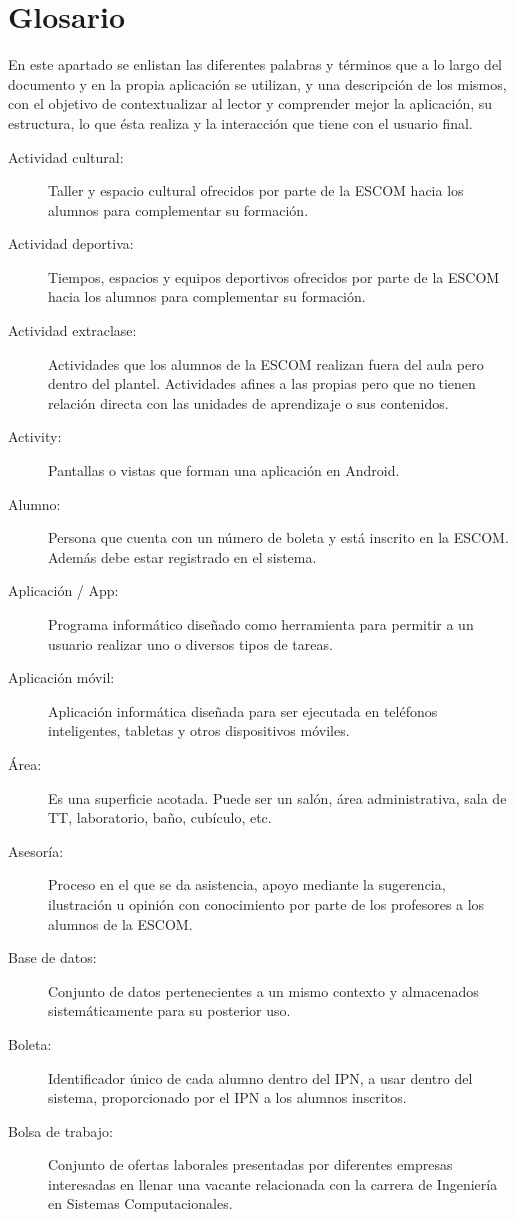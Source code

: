 \section{Glosario}

\noindent
En este apartado se enlistan las diferentes palabras y términos que a lo largo del documento y en la propia aplicación se utilizan, y una descripción de los mismos, con el objetivo de contextualizar al lector y comprender mejor la aplicación, su estructura, lo que ésta realiza y la interacción que tiene con el usuario final. \\

\begin{description}
	\item[Actividad cultural:] Taller y espacio cultural ofrecidos por parte de la ESCOM hacia los alumnos para complementar su formación. 
	\item[Actividad deportiva:] Tiempos, espacios y equipos deportivos ofrecidos por parte de la ESCOM hacia los alumnos para complementar su formación. 
	\item[Actividad extraclase:] Actividades que los alumnos de la ESCOM realizan fuera del aula pero dentro del plantel. Actividades afines a las propias pero que no tienen relación directa con las unidades de aprendizaje o sus contenidos. 
	\item[Activity:] Pantallas o vistas que forman una aplicación en Android.
	\item[Alumno:] Persona que cuenta con un número de boleta y está inscrito en la ESCOM. Además debe estar registrado en el sistema.
	\item[Aplicación / App:] Programa informático diseñado como herramienta para permitir a un usuario realizar uno o diversos tipos de tareas. 
	\item[Aplicación móvil:] Aplicación informática diseñada para ser ejecutada en teléfonos inteligentes, tabletas y otros dispositivos móviles. 
	\item[Área:] Es una superficie acotada. Puede ser un salón, área administrativa, sala de TT, laboratorio, baño, cubículo, etc.
	\item[Asesoría:] Proceso en el que se da asistencia, apoyo mediante la sugerencia, ilustración u opinión con conocimiento por parte de los profesores a los alumnos de la ESCOM.
	
	\item[Base de datos:] Conjunto de datos pertenecientes a un mismo contexto y almacenados sistemáticamente para su posterior uso.
	\item[Boleta:] Identificador único de cada alumno dentro del IPN, a usar dentro del sistema, proporcionado por el IPN a los alumnos inscritos.
	\item[Bolsa de trabajo:] Conjunto de ofertas laborales presentadas por diferentes empresas interesadas en llenar una vacante relacionada con la carrera de Ingeniería en Sistemas Computacionales.
	

\end{description}
